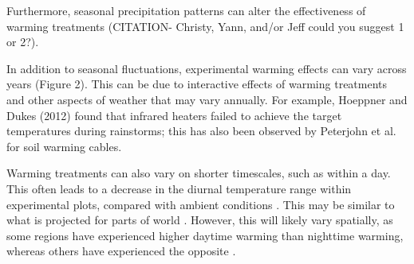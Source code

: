 \documentclass{article}
\begin{document}
Furthermore, seasonal precipitation patterns can alter the effectiveness of warming treatments (CITATION- Christy, Yann, and/or Jeff could you suggest 1 or 2?). %
\par In addition to seasonal fluctuations, experimental warming effects can vary across years  (Figure  2).   This  can be due  to interactive effects of warming  treatments and  other aspects of weather  that may  vary  annually.  For  example,  Hoeppner  and  Dukes  (2012) found  that infrared heaters  failed to achieve the target temperatures during  rainstorms;%
this has also been observed by Peterjohn et al. \citep{peterjohn1993} for soil warming cables.  %

\par Warming treatments can also vary on shorter timescales, such as within a day. This often leads to a decrease in the diurnal temperature range within experimental plots, compared with ambient conditions \citep{hoeppner2012}. This may be similar to what is projected for parts of world \citep{ipcc2013}. However, this will likely vary spatially, as some regions have experienced higher daytime warming than nighttime warming, whereas others have experienced the opposite \citep{ipcc2013}. %
\end{document}
